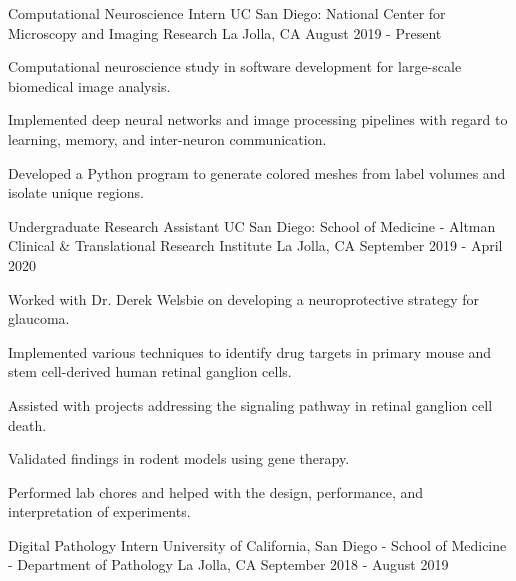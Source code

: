 \begin{cventries}
{\begin{cvitems}
  \end{cvitems}
}
\cventry
{Computational Neuroscience Intern} %
{UC San Diego: National Center for Microscopy and Imaging Research} %
{La Jolla, CA} %
{August 2019 - Present} %
{
  \begin{cvitems} %
    \item {Computational neuroscience study in software development for large-scale biomedical image analysis.}
    \item {Implemented deep neural networks and image processing pipelines with regard to learning, memory, and inter-neuron communication.}
    \item {Developed a Python program to generate colored meshes from label volumes and isolate unique regions.}
  \end{cvitems}
}
  \cventry
    {Undergraduate Research Assistant} %
    {UC San Diego: School of Medicine - Altman Clinical \& Translational Research Institute} %
    {La Jolla, CA} %
    {September 2019 - April 2020} %
    {
      \begin{cvitems} %
        \item {Worked with Dr. Derek Welsbie on developing a neuroprotective strategy for glaucoma.}
        \item {Implemented various techniques to identify drug targets in primary mouse and stem cell-derived human retinal ganglion cells.}
        \item {Assisted with projects addressing the signaling pathway in retinal ganglion cell death.}
        \item {Validated findings in rodent models using gene therapy.}
        \item {Performed lab chores and helped with the design, performance, and interpretation of experiments.}
      \end{cvitems}
    }
  \cventry
    {Digital Pathology Intern} %
    {University of California, San Diego - School of Medicine - Department of Pathology} %
    {La Jolla, CA} %
    {September 2018 - August 2019} %
    {
      \begin{cvitems} %

\end{cvitems}}
\end{cventries}
